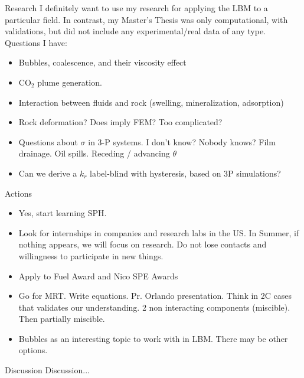 \documentclass{beamer}
\begin{document}
	\begin{frame}{Research}
		I definitely want to use my research for applying the LBM to a particular field. In contrast, my Master's Thesis was only computational, with validations, but did not include any experimental/real data of any type. Questions I have:
		\begin{itemize}
			\item Bubbles, coalescence, and their viscosity effect
			\item CO$_2$ plume generation.
			\item Interaction between fluids and rock (swelling, mineralization, adsorption)
			\item Rock deformation? Does imply FEM? Too complicated? 
			\item Questions about $\sigma$ in 3-P systems. I don't know? Nobody knows? Film drainage. Oil spills. Receding / advancing $\theta$ 
			\item Can we derive a $k_r$ label-blind with hysteresis, based on 3P simulations?
		\end{itemize}
		
	\end{frame}

	\begin{frame}{Actions}
		\begin{itemize}
			\item Yes, start learning SPH. 
			\item Look for internships in companies and research labs in the US. In Summer, if nothing appears, we will focus on research. Do not lose contacts and willingness to participate in new things.
			\item Apply to Fuel Award and Nico SPE Awards
			\item Go for MRT. Write equations. Pr. Orlando presentation. Think in 2C cases that validates our understanding. 2 non interacting components (miscible). Then partially miscible. 
			\item Bubbles as an interesting topic to work with in LBM. There may be other options.
		\end{itemize}
	\end{frame}
	
	\begin{frame}{Discussion}
		Discussion...
	\end{frame}
	
	
\end{document}
